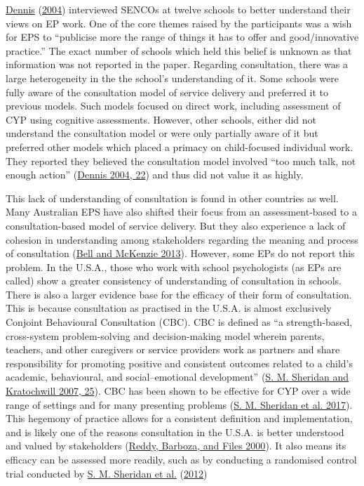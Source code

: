 \documentclass[
]{article}
\begin{document}
\protect\hyperlink{ref-dennisFarGoodQualitative2004}{Dennis}
(\protect\hyperlink{ref-dennisFarGoodQualitative2004}{2004}) interviewed
SENCOs at twelve schools to better understand their views on EP work.
One of the core themes raised by the participants was a wish for EPS to
``publicise more the range of things it has to offer and good/innovative
practice.'' The exact number of schools which held this belief is
unknown as that information was not reported in the paper. Regarding
consultation, there was a large heterogeneity in the the school's
understanding of it. Some schools were fully aware of the consultation
model of service delivery and preferred it to previous models. Such
models focused on direct work, including assessment of CYP using
cognitive assessments. However, other schools, either did not understand
the consultation model or were only partially aware of it but preferred
other models which placed a primacy on child-focused individual work.
They reported they believed the consultation model involved ``too much
talk, not enough action''
(\protect\hyperlink{ref-dennisFarGoodQualitative2004}{Dennis 2004, 22})
and thus did not value it as highly.

This lack of understanding of consultation is found in other countries
as well. Many Australian EPS have also shifted their focus from an
assessment-based to a consultation-based model of service delivery. But
they also experience a lack of cohesion in understanding among
stakeholders regarding the meaning and process of consultation
(\protect\hyperlink{ref-bellPerceptionsRealitiesRole2013}{Bell and
McKenzie 2013}). However, some EPs do not report this problem. In the
U.S.A., those who work with school psychologists (as EPs are called)
show a greater consistency of understanding of consultation in schools.
There is also a larger evidence base for the efficacy of their form of
consultation. This is because consultation as practised in the U.S.A. is
almost exclusively Conjoint Behavioural Consultation (CBC). CBC is
defined as ``a strength-based, cross-system problem-solving and
decision-making model wherein parents, teachers, and other caregivers or
service providers work as partners and share responsibility for
promoting positive and consistent outcomes related to a child's
academic, behavioural, and social--emotional development''
(\protect\hyperlink{ref-sheridanConjointBehavioralConsultation2007}{S.
M. Sheridan and Kratochwill 2007, 25}). CBC has been shown to be
effective for CYP over a wide range of settings and for many presenting
problems
(\protect\hyperlink{ref-sheridanRandomizedTrialExamining2017}{S. M.
Sheridan et al. 2017}). This hegemony of practice allows for a
consistent definition and implementation, and is likely one of the
reasons consultation in the U.S.A. is better understood and valued by
stakeholders
(\protect\hyperlink{ref-reddyClinicalFocusConsultation2000}{Reddy,
Barboza, and Files 2000}). It also means its efficacy can be assessed
more readily, such as by conducting a randomised control trial conducted
by \protect\hyperlink{ref-sheridanRandomizedTrialExamining2012}{S. M.
Sheridan et al.}
(\protect\hyperlink{ref-sheridanRandomizedTrialExamining2012}{2012})
\end{document}
